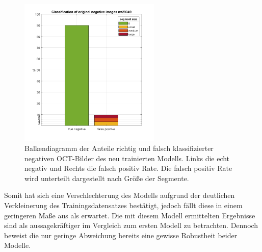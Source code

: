 \begin{figure}[H]
\centering
\includegraphics[width=0.6\textwidth]{./pic/Segmentierung/eval_neg_train2.png}
\caption{\label{fig:iou_neg_t2} Balkendiagramm der Anteile richtig und falsch klassifizierter negativen OCT-Bilder des neu trainierten Modells. Links die echt negativ und Rechts die falsch positiv Rate. Die falsch positiv Rate wird unterteilt dargestellt nach Größe der Segmente. }
\end{figure}



Somit hat sich eine Verschlechterung des Modells aufgrund der deutlichen Verkleinerung des Trainingsdatensatzes bestätigt, jedoch fällt diese in einem geringeren Maße aus als erwartet. 
Die mit diesem Modell ermittelten Ergebnisse sind als aussagekräftiger im Vergleich zum ersten Modell zu betrachten. Dennoch beweist die nur geringe Abweichung bereits eine gewisse Robustheit beider Modelle. 